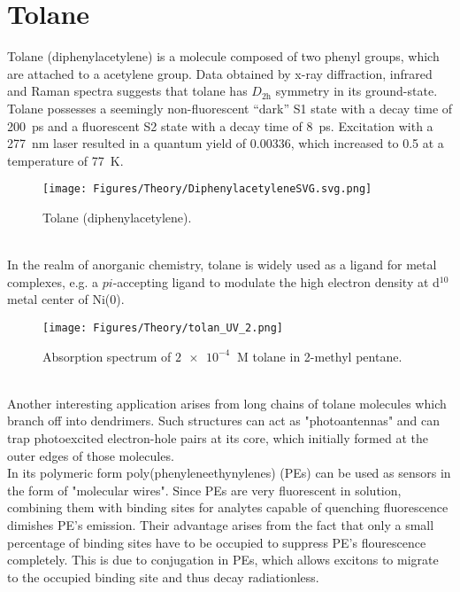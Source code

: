 \section{Tolane}
Tolane (diphenylacetylene) is a molecule composed of two phenyl groups, which are attached to a acetylene group. Data obtained by x-ray diffraction\cite{tol_xray}, infrared\cite{tol_infra} and Raman\cite{tol_raman} spectra suggests that tolane has $D_{2\mathrm{h}}$ symmetry in its ground-state. Tolane possesses a seemingly non-fluorescent ``dark'' S1 state with a decay time of \SI{200}{\pico\second}
and a fluorescent S2 state with a decay time of \SI{8}{\pico\second}.\cite{tol_states} Excitation with a \SI{277}{\nano\meter} laser resulted in a quantum yield of 0.00336, which increased to 0.5 at a temperature of \SI{77}{K}.\cite{tol_1}
%
%
\begin{figure}[h]
\centering
\texttt{[image: Figures/Theory/DiphenylacetyleneSVG.svg.png]}
\caption{Tolane (diphenylacetylene).}
\label{fig:tolane}
\end{figure}\\
%
In the realm of anorganic chemistry, tolane is widely used as a ligand for metal complexes, e.g. a $pi$-accepting ligand to modulate the high electron density at d$^{10}$ metal center of Ni(0).\cite{tol_ligand} \\
%
\begin{figure}[h]
\centering
\texttt{[image: Figures/Theory/tolan\_UV\_2.png]}
\caption{Absorption spectrum of $\SI{2e-4}{}$ M tolane in 2-methyl pentane.\cite{tol_uv_spec}}
\label{fig:tolane_UV}
\end{figure}\\
%
Another interesting application arises from long chains of tolane molecules which branch off into dendrimers. 
Such structures can act as "photoantennas" and can trap photoexcited electron-hole pairs at its core, which initially formed at the outer edges of those molecules.\cite{tol_dendrimer}\\
In its polymeric form poly(phenyleneethynylenes) (PEs) can be used as sensors in the form of "molecular wires".\cite{swager1998molecular}
Since PEs are very fluorescent in solution, combining them with binding sites for analytes capable of quenching fluorescence dimishes PE's emission.
Their advantage arises from the fact that only a small percentage of binding sites have to be occupied to suppress PE's flourescence completely.
This is due to conjugation in PEs, which allows excitons to migrate to the occupied binding site and thus decay radiationless.\cite{Bunz2001}
